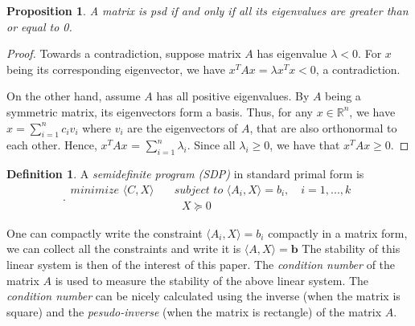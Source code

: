 \documentclass[12pt]{amsart}
\numberwithin{equation}{section}
\newtheorem{prop}[thm]{Proposition}
\theoremstyle{definition}
\newtheorem{definition}[thm]{Definition}
\numberwithin{thm}{section}
\begin{document}
\begin{prop}
     A matrix is psd if and only if all its eigenvalues are greater than or equal to 0.
\end{prop}

\begin{proof}
     Towards a contradiction, suppose matrix $A$ has eigenvalue $\lambda < 0$.
     For $x$ being its corresponding eigenvector, we have $x^T A x = \lambda x^T x < 0$, a contradiction.
     
     On the other hand, assume $A$ has all positive eigenvalues. By $A$ being a symmetric matrix, 
     its eigenvectors form a basis. 
     Thus, for any $x \in \mathbb{R}^n$, we have
     $x = \sum_{i = 1} ^ n c_i v_i $ where $v_i$ are the eigenvectors of $A$, that are also orthonormal to each other.
     Hence, $x^T A x$ = $\sum_{i = 1} ^ n \lambda_i$. Since all $\lambda_i \geq 0$, we have that $x ^ T A x \geq 0$.
\end{proof}

\begin{definition}
     \label{def:SDP}
     A \emph{semidefinite program (SDP)} in standard primal form is
     \begin{equation}\label{eq:2.3}.
          \begin{split}
               \textit{minimize } \langle C, X \rangle & \quad \textit{subject to } \langle A_i, X \rangle = b_i, \quad i=1,...,k \\
               & \quad \textit{\ \ \ \ \ \ \ \ \ \ \ \ \ } X \succcurlyeq 0 
          \end{split}
     \end{equation}
\end{definition}


\smallskip

One can compactly write the constraint $\langle A_i, X \rangle = b_i$ compactly in a matrix form, we can collect all the constraints and write it is $ \langle A, X \rangle = \mathbf{b}$ 
The stability of this linear system is then of the interest of this paper. 
The \emph{condition number} of the matrix $A$ is used to measure the stability of the above linear system. 
The \emph{condition number} can be nicely calculated using the inverse (when the matrix is square) and the \emph{pesudo-inverse} (when the matrix is rectangle) of the matrix $A$.
\end{document}
